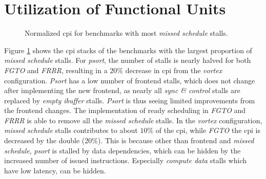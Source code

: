 
\section{Utilization of Functional Units}

\begin{figure}
    \centering
    \caption{Normalized \acrshort{cpi} for benchmarks with most \textit{missed schedule} stalls.}
    \label{fig:cpi_missed_schedule}
\end{figure}

Figure \ref{fig:cpi_missed_schedule} shows the \acrshort{cpi} stacks of the benchmarks with the largest proportion of \textit{missed schedule} stalls. For \textit{psort}, the number of stalls is nearly halved for both \textit{FGTO} and \textit{FRRR}, resulting in a $20\%$ decrease in \acrshort{cpi} from the \textit{\Gls{vortex}} configuration. \textit{Psort} has a low number of frontend stalls, which does not change after implementing the new frontend, as nearly all \textit{sync \& control} stalls are replaced by \textit{empty ibuffer} stalls. \textit{Psort} is thus seeing limited improvements from the frontend changes. The implementation of ready scheduling in \textit{FGTO} and \textit{FRRR} is able to remove all the \textit{missed schedule} stalls. In the \textit{\Gls{vortex}} configuration, \textit{missed schedule} stalls contributes to about $10\%$ of the \acrshort{cpi}, while  \textit{FGTO} the \acrshort{cpi} is decreased by the double ($20\%$). This is because other than frontend and \textit{missed schedule}, \textit{psort} is stalled by data dependencies, which can be hidden by the increased number of issued instructions. Especially \textit{compute data} stalls which have low latency, can be hidden.

